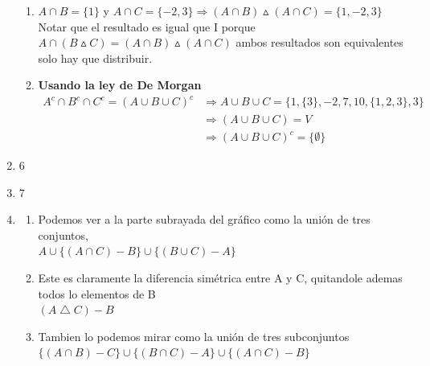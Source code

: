 \documentclass[12pt]{book}
\begin{document}
\begin{enumerate}
\begin{enumerate}[i]
	\item $ A\cap B = \{ 1\} $ y $ A\cap C = \{ -2,3\}  \Rightarrow  (A\cap B) \vartriangle (A\cap C ) =  \{1, 					-2,3\} $ \\
	Notar que el resultado es igual que I porque $ A\cap (B\vartriangle C ) =  (A\cap B) \vartriangle (A\cap C )$
	ambos resultados son equivalentes solo hay que distribuir.\\
	
	\item \textbf{Usando la ley de De Morgan} 
	\begin{align*}
	A^{c} \cap B^c \cap C^c = (A\cup B\cup C)^c & \Rightarrow A \cup B\cup C = \{1, \{3\}, -2, 7, 10, \{1, 2, 3\}, 3\} \\
	&\Rightarrow (A\cup B\cup C) =  V  \\
	&\Rightarrow (A\cup B\cup C)^c = \lbrace \emptyset \rbrace
	\end{align*}
	
	\end{enumerate}
	\item 6
	\item 7
	\item 
	\begin{enumerate}[i]
	\item Podemos ver a la parte subrayada del gr\'afico como la uni\'on de tres conjuntos, \\
	$ A \cup \{ (A\cap C) - B\} \cup \{(B\cup C) - A \}$
	\item Este es claramente la diferencia sim\'etrica entre A y C, quitandole ademas todos lo elementos de B \\
	$ (A \bigtriangleup C) - B $
	\item Tambien lo podemos mirar como la uni\'on de tres subconjuntos \\
	$ \{ (A \cap B)-C\} \cup \{ (B \cap C)-A\} \cup \{ (A \cap C)-B\}   $
	\end{enumerate}
	

\end{enumerate}
\end{document}
